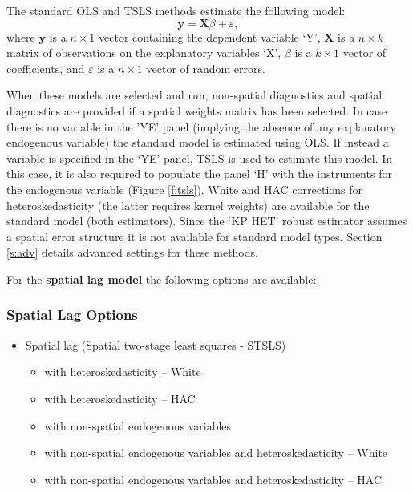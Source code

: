 \documentclass{article}
\begin{document}
The standard OLS and TSLS methods estimate the following model:
\begin{equation}
\mathbf{y} =  \mathbf{X}\beta + \varepsilon,
\end{equation}
where $\mathbf{y}$ is a $n \times 1$ vector containing the dependent variable `Y', $\mathbf{X}$ is a $n \times k$ matrix of observations on the explanatory variables `X', $\beta$ is a $k \times 1$ vector of coefficients, and $\varepsilon$ is a $n \times 1$ vector of random errors.

When these models are selected and run, non-spatial diagnostics and spatial diagnostics are provided if a spatial weights matrix has been selected. In case there is no variable in the 'YE' panel (implying the absence of any explanatory endogenous variable) the standard model is estimated using OLS. If instead a variable is specified in the `YE' panel, TSLS is used to estimate this model. In this case, it is also required to populate the panel `H' with the instruments for the endogenous variable (Figure \ref{f:tsls}). White and HAC corrections for heteroskedasticity (the latter requires kernel weights) are available for the standard model (both estimators). Since the `KP HET' robust estimator assumes a spatial error structure it is not available for standard model types. Section \ref{s:adv}  details advanced settings for these methods.
\FloatBarrier

For the \textbf{spatial lag model} the following options are available:

\subsubsection*{Spatial Lag Options}
\begin{itemize}
\item Spatial lag (Spatial two-stage least squares - STSLS)
     \begin{itemize}
     \item with heteroskedasticity -- White
     \item with heteroskedasticity -- HAC
     \item with non-spatial endogenous variables
     \item with non-spatial endogenous variables and heteroskedasticity -- White
     \item with non-spatial endogenous variables and heteroskedasticity -- HAC
     \end{itemize}
\end{itemize}
\end{document}
